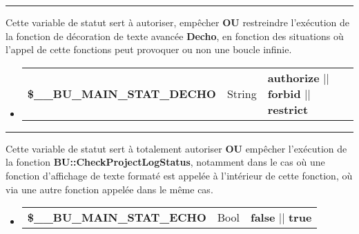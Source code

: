 \documentclass[a4paper,10pt]{article}
\begin{document}

\par\noindent\rule{\textwidth}{0.4pt}

\begin{justify}
    Cette variable de statut sert à autoriser, empêcher \textbf{OU} restreindre l'exécution de la fonction de décoration de texte avancée \textbf{\color{mauve}Decho}, en fonction des situations où l'appel de cette fonctions peut provoquer ou non une boucle infinie.
\end{justify}

\begin{justify}
     \begin{itemize}
        \item
        {
            \begin{tabular}{l|l|l}
                \textbf{\color{vars}\$\_\_BU\_MAIN\_STAT\_DECHO}  & String    & \textbf{authorize} || \textbf{forbid} || \textbf{restrict}\\[1\baselineskip]
            \end{tabular}
        }
    \end{itemize}
\end{justify}


\par\noindent\rule{\textwidth}{0.4pt}

\begin{justify}
    Cette variable de statut sert à totalement autoriser \textbf{OU} empêcher l'exécution de la fonction \textbf{\color{mauve}BU::CheckProjectLogStatus}, notamment dans le cas où une fonction d'affichage de texte formaté est appelée à l'intérieur de cette fonction, où via une autre fonction appelée dans le même cas.
\end{justify}

\begin{justify}
     \begin{itemize}
        \item
        {
            \begin{tabular}{l|l|l}
                \textbf{\color{vars}\$\_\_BU\_MAIN\_STAT\_ECHO}   & Bool      & \textbf{false} || \textbf{true}\\[1\baselineskip]
            \end{tabular}
        }
    \end{itemize}
\end{justify}

\end{document}
